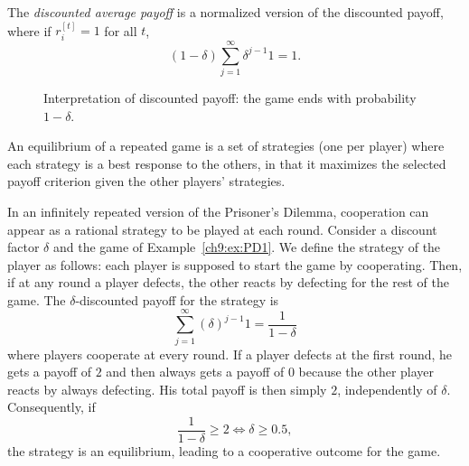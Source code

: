 The \emph{discounted average payoff} is a normalized version of the
discounted payoff, where if $r_i^{[t]} = 1$ for all $t$,
$$(1-\delta) \sum_{j = 1}^{\infty} \delta^{j-1} 1 = 1.$$

\begin{figure}
    \centering
    \caption{Interpretation of discounted payoff: the game ends with
    probability $1 - \delta$.}
    \label{fig:infiRepeatedDiscount}
\end{figure}

\begin{definition}
An equilibrium of a repeated game is a set of strategies (one per player)
where each strategy is a best response to the others, in that it maximizes
the selected payoff criterion given the other players' strategies.
\end{definition}

\begin{example}
\label{ch9:ex:trigger}
In an infinitely repeated version of the Prisoner's Dilemma, cooperation
can appear as a rational strategy to be played at each round.
Consider a discount factor $\delta$ and the game of
Example~\ref{ch9:ex:PD1}.
We define the strategy of the player as follows: each player is supposed
to start the game by cooperating. Then, if at any round a player defects,
the other reacts by defecting for the rest of the game.
The $\delta$-discounted payoff for the strategy is
$$\sum_{j = 1}^{\infty}(\delta)^{j-1} 1 = \frac{1}{1-\delta}$$
where players cooperate at every round.
If a player defects at the first round, he gets a payoff of $2$ and then
always gets a payoff of $0$ because the other player reacts by always
defecting. His total payoff is then simply $2$, independently of $\delta$.
Consequently, if
$$\frac{1}{1-\delta} \geq 2 \Leftrightarrow \delta \geq 0.5,$$
the  strategy is an equilibrium, leading to a cooperative outcome for
the game.
\end{example}

